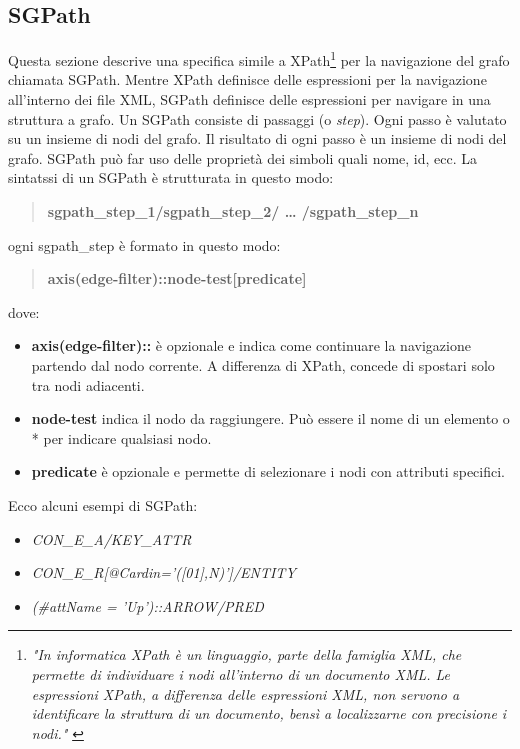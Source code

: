         \subsection{SGPath}
            Questa sezione descrive una specifica simile a XPath\footnote{\textit{"In informatica XPath è un linguaggio, parte della famiglia XML, che permette di individuare i nodi all'interno di un documento XML. Le espressioni XPath, a differenza delle espressioni XML, non servono a identificare la struttura di un documento, bensì a localizzarne con precisione i nodi."} \cite{xpath}} per la navigazione del grafo chiamata SGPath. Mentre XPath definisce delle espressioni per la navigazione all'interno dei file XML, SGPath definisce delle espressioni per navigare in una struttura a grafo.
            \newline
            Un SGPath consiste di passaggi (o \textit{step}). Ogni passo è valutato su un insieme di nodi del grafo. Il risultato di ogni passo è un insieme di nodi del grafo. SGPath può far uso delle proprietà dei simboli quali nome, id, ecc.
            \newline
            La sintatssi di un SGPath è strutturata in questo modo:
            \begin{quotation}
                \textbf{sgpath\_step\_1/sgpath\_step\_2/ … /sgpath\_step\_n}
            \end{quotation}
            ogni sgpath\_step è formato in questo modo:
            \begin{quotation}
                \textbf{axis(edge-filter)::node-test[predicate]}
            \end{quotation}
            dove:
            \begin{itemize}
                \item \textbf{axis(edge-filter)::} è opzionale e indica come continuare la navigazione partendo dal nodo corrente. A differenza di XPath, concede di spostari solo tra nodi adiacenti.
                \item \textbf{node-test} indica il nodo da raggiungere. Può essere il nome di un elemento o * per indicare qualsiasi nodo.
                \item \textbf{\lbrack predicate\rbrack} è opzionale e permette di selezionare i nodi con attributi specifici.
            \end{itemize}
            Ecco alcuni esempi di SGPath:
            \begin{itemize}
                \item \textit{CON\_E\_A/KEY\_ATTR}
                \item \textit{CON\_E\_R[@Cardin='([01],N)']/ENTITY}
                \item \textit{(\#attName = 'Up')::ARROW/PRED}
            \end{itemize}
